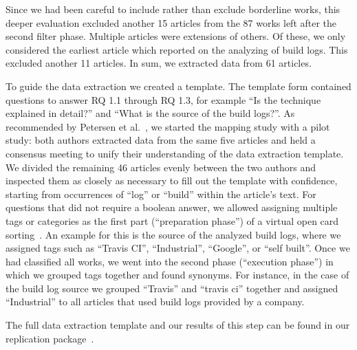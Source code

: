 Since we had been careful to include rather than exclude borderline
works, this deeper evaluation excluded another 15 articles from the 87
works left after the second filter phase.
Multiple articles were extensions of others.
Of these, we only considered the earliest article which reported on
the analyzing of build logs.
This excluded another 11 articles.
In sum, we extracted data from 61 articles.

To guide the data extraction we created a template.
The template form contained questions to answer RQ 1.1 through RQ 1.3,
for example ``Is the technique explained in detail?'' and
``What is the source of the build logs?''.
As recommended by Petersen et
al.~\cite{petersen2015guidelines}, we started the mapping study with a
pilot study:
both authors extracted data from the same five articles and held a
consensus meeting to unify their understanding
of the data extraction template.
We divided the remaining 46 articles evenly between the two authors
and inspected them as closely as necessary to fill out the template
with confidence,
starting from occurrences of ``log'' or ``build'' within the article's
text.
For questions that did not require a boolean answer, we allowed assigning
multiple tags or categories as the first part (``preparation phase'')
of a virtual open card sorting~\cite{zimmermann2016card}.
An example for this is the source of the analyzed build logs,
where we assigned tags such as ``Travis CI'',
``Industrial'', ``Google'', or
``self built''.
Once we had classified all works, we went into the second phase
(``execution phase'') in which we grouped tags
together and found synonyms.
For instance, in the case of the build log source we grouped
``Travis'' and ``travis ci'' together and assigned ``Industrial'' to
all articles that used build logs provided by a company.

The full data extraction template and our results of this step can be
found in our replication package~\cite{brandt2020chunk-replication}.


